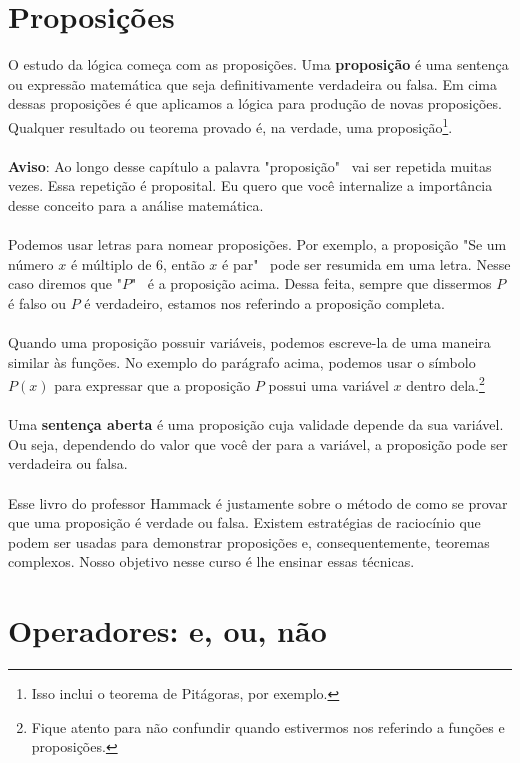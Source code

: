 \documentclass[a4paper,11pt]{book}
\theoremstyle{definition}
\begin{document}
\section{Proposições}

O estudo da lógica começa com as proposições. Uma \textbf{proposição} é uma sentença ou expressão matemática que seja definitivamente verdadeira ou falsa. Em cima dessas proposições é que aplicamos a lógica para produção de novas proposições. Qualquer resultado ou teorema provado é, na verdade, uma proposição\footnote{Isso inclui o teorema de Pitágoras, por exemplo.}. 
\\
\\
\textbf{Aviso}: Ao longo desse capítulo a palavra "proposição" \ vai ser repetida muitas vezes. Essa repetição é proposital. Eu quero que você internalize a importância desse conceito para a análise matemática.
\\
\\
Podemos usar letras para nomear proposições. Por exemplo, a proposição "Se um número $x$ é múltiplo de 6, então $x$ é par" \  pode ser resumida em uma letra. Nesse caso diremos que "$P$" \ é a proposição acima. Dessa feita, sempre que dissermos $P$ é falso ou $P$ é verdadeiro, estamos nos referindo a proposição completa.
\\
\\
Quando uma proposição possuir variáveis, podemos escreve-la de uma maneira similar às funções. No exemplo do parágrafo acima, podemos usar o símbolo $P(x)$ para expressar que a proposição $P$ possui uma variável $x$ dentro dela.\footnote{Fique atento para não confundir quando estivermos nos referindo a funções e proposições.}
\\
\\
Uma \textbf{sentença aberta} é uma proposição cuja validade depende da sua variável. Ou seja, dependendo do valor que você der para a variável, a proposição pode ser verdadeira ou falsa.
\\
\\
Esse livro do professor Hammack é justamente sobre o método de como se provar que uma proposição é verdade ou falsa. Existem estratégias de raciocínio que podem ser usadas para demonstrar proposições e, consequentemente, teoremas complexos. Nosso objetivo nesse curso é lhe ensinar essas técnicas.

\section{Operadores: e, ou, não}
\end{document}
